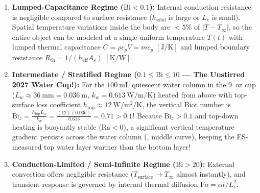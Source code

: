\begin{enumerate}
  \item \textbf{Lumped-Capacitance Regime ($\mathrm{Bi} < 0.1$):} Internal conduction resistance is negligible compared to surface resistance ($k_{\mathrm{solid}}$ is large or $L_c$ is small). Spatial temperature variations inside the body are $<5\%$ of $|T - T_\infty|$, so the entire object can be modeled at a single uniform temperature $T(t)$ with lumped thermal capacitance $C = \rho c_p V = m c_p$ $[\si{\joule\per\kelvin}]$ and lumped boundary resistance $R_{\mathrm{th}} = 1/(h_{\mathrm{eff}}A_s)$ $[\si{\kelvin\per\watt}]$.
  \item \textbf{Intermediate / Stratified Regime ($0.1 \le \mathrm{Bi} \le 10$ — The Unstirred 2027 Water Cup!):} For the $\SI{100}{\milli\liter}$ quiescent water column in the 9~oz cup ($L_w \approx \SI{36}{\milli\meter} = \SI{0.036}{\meter}$, $k_w = \SI{0.613}{\watt\per\meter\per\kelvin}$) heated from above with top-surface loss coefficient $h_{\mathrm{top}} \approx \SI{12}{\watt\per\square\meter\per\kelvin}$, the vertical Biot number is $\mathrm{Bi}_z = \frac{h_{\mathrm{top}}L_w}{k_w} = \frac{(12)(0.036)}{0.613} = \mathbf{0.71 > 0.1}$! Because $\mathrm{Bi}_z > 0.1$ and top-down heating is buoyantly stable ($\mathrm{Ra} < 0$), a significant vertical temperature gradient persists across the water column (, middle curve), keeping the ES-measured top water layer warmer than the bottom layer!
  \item \textbf{Conduction-Limited / Semi-Infinite Regime ($\mathrm{Bi} > 20$):} External convection offers negligible resistance ($T_{\mathrm{surface}} \to T_\infty$ almost instantly), and transient response is governed by internal thermal diffusion $\mathrm{Fo} = \alpha t / L_c^2$.
\end{enumerate}


